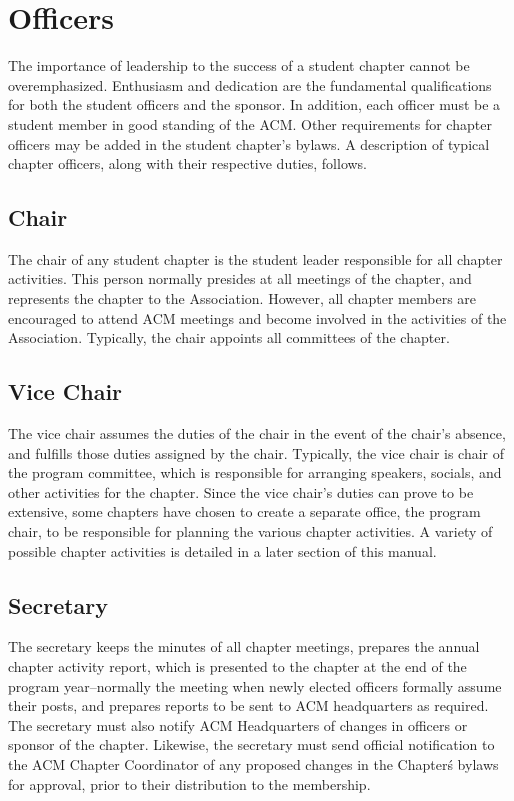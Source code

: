 \section*{Officers}

The importance of leadership to the success of a student chapter cannot be
overemphasized. Enthusiasm and dedication are the fundamental qualifications for
both the student officers and the sponsor. In addition, each officer must be a
student member in good standing of the ACM. Other requirements for chapter
officers may be added in the student chapter's bylaws. A description of typical
chapter officers, along with their respective duties, follows.

\subsection*{Chair}
The chair of any student chapter is the student leader responsible for all
chapter activities. This person normally presides at all meetings of the chapter,
and represents the chapter to the Association. However, all chapter members are
encouraged to attend ACM meetings and become involved in the activities of the
Association. Typically, the chair appoints all committees of the chapter.

\subsection*{Vice Chair}
The vice chair assumes the duties of the chair in the event of the chair's
absence, and fulfills those duties assigned by the chair. Typically, the vice
chair is chair of the program committee, which is responsible for arranging
speakers, socials, and other activities for the chapter. Since the vice chair's
duties can prove to be extensive, some chapters have chosen to create a separate
office, the program chair, to be responsible for planning the various chapter
activities. A variety of possible chapter activities is detailed in a later
section of this manual.

\subsection*{Secretary}
The secretary keeps the minutes of all chapter meetings, prepares the annual
chapter activity report, which is presented to the chapter at the end of the
program year--normally the meeting when newly elected officers formally assume
their posts, and prepares reports to be sent to ACM headquarters as required.
The secretary must also notify ACM Headquarters of changes in officers or
sponsor of the chapter. Likewise, the secretary must send official notification
to the ACM Chapter Coordinator of any proposed changes in the Chapter\'s bylaws
for approval, prior to their distribution to the membership.

